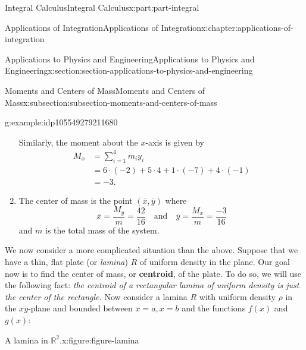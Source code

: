 \documentclass[twoside,10pt,]{book}
\newcommand{\terminology}[1]{\textbf{#1}}
\numberwithin{equation}{part}
\newcommand{\amp}{&}
\begin{document}
\begin{partptx}{Integral Calculus}{}{Integral Calculus}{}{}{x:part:part-integral}
\begin{chapterptx}{Applications of Integration}{}{Applications of Integration}{}{}{x:chapter:applications-of-integration}
\begin{sectionptx}{Applications to Physics and Engineering}{}{Applications to Physics and Engineering}{}{}{x:section:section-applications-to-physics-and-engineering}
\begin{subsectionptx}{Moments and Centers of Mass}{}{Moments and Centers of Mass}{}{}{x:subsection:subsection-moments-and-centers-of-mass}
\begin{example}{}{g:example:idp105549279211680}
\begin{enumerate}
%
\par
Similarly, the moment about the \(x\)-axis is given by%
\begin{align*}
M_{x}\amp= \sum_{i=1}^{4}m_{i}y_{i}\\
\amp= 6\cdot(-2)+5\cdot4+1\cdot(-7)+4\cdot(-1)\\
\amp= -3.
\end{align*}
%
\item{}The center of mass is the point \((\overline{x},\overline{y})\) where%
\begin{equation*}
\overline{x} = \frac{M_{y}}{m} = \frac{42}{16}\quad\text{and}\quad\overline{y}=\frac{M_{x}}{m} = \frac{-3}{16}
\end{equation*}
and \(m\) is the total mass of the system.%
\end{enumerate}
\end{example}
\textbraceright{} We now consider a more complicated situation than the above. Suppose that we have a thin, flat plate (or \emph{lamina}) \(R\) of uniform density in the plane. Our goal now is to find the center of mass, or \terminology{centroid}, of the plate. To do so, we will use the following fact: \emph{the centroid of a rectangular lamina of uniform density is just the center of the rectangle.} Now consider a lamina \(R\) with uniform density \(\rho\) in the \(xy\)-plane and bounded between \(x=a,x=b\) and the functions \(f(x)\) and \(g(x)\):%
\begin{figureptx}{A lamina in \(\mathbb{R}^{2}\).}{x:figure:figure-lamina}{}%
\begin{image}{0}{1}{0}%
\resizebox{\linewidth}{!}{%
\begin{tikzpicture}
\begin{axis}[
axis lines=middle,
xmin=-0.5,
xmax=8,
ymin=-5,
ymax=7,
domain=0.5:7.5,
xtick={0.75,6.25},
xticklabels={$a$,$b$},
ytick={0},
axis on top
]


\end{axis}
\end{tikzpicture}}
\end{image}
\end{figureptx}
\end{subsectionptx}
\end{sectionptx}
\end{chapterptx}
\end{partptx}
\end{document}
